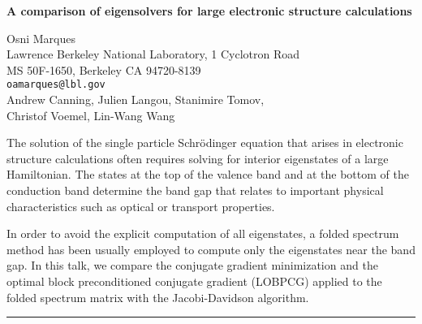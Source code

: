 \documentclass[twosided]{report}
\begin{document}
\begin{center}
{\large			%
{\bf A comparison of eigensolvers for large electronic structure calculations}}

	Osni Marques \\
	Lawrence Berkeley National Laboratory, 1 Cyclotron Road \\
	MS 50F-1650, Berkeley CA 94720-8139 \\
	{\tt oamarques@lbl.gov} \\
	Andrew Canning, Julien Langou, Stanimire Tomov, \\
	Christof Voemel, Lin-Wang Wang
\end{center}
The solution of the single particle Schr\"{o}dinger equation
that arises in electronic structure calculations often
requires solving for interior eigenstates of a large
Hamiltonian. The states at the top of the valence band and
at the bottom of the conduction band determine the band gap
that relates to important physical characteristics such as
optical or transport properties.

In order to avoid the
explicit computation of all eigenstates, a folded spectrum
method has been usually employed to compute only the
eigenstates near the band gap. In this talk, we compare the
conjugate gradient minimization and the optimal block
preconditioned conjugate gradient (LOBPCG) applied to the
folded spectrum matrix with the Jacobi-Davidson algorithm.



	\begin{center} \rule{6in}{1pt} \end{center}
\end{document}
